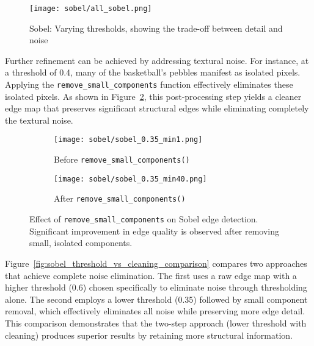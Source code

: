 \documentclass[12pt,a4paper]{article}
\begin{document}
\vspace{1cm}

\begin{figure}[H]
    \centering
    \texttt{[image: sobel/all\_sobel.png]}
    \caption{Sobel: Varying thresholds, showing the trade-off between detail and noise}
    \label{fig:sobel_visual_results}
\end{figure}


\newpage

Further refinement can be achieved by addressing textural noise. For instance, at a threshold of 0.4, many of the basketball's pebbles manifest as isolated pixels. Applying the \texttt{remove\_small\_components} function effectively eliminates these isolated pixels. As shown in Figure~\ref{fig:sobel_component_removal_comparison}, this post-processing step yields a cleaner edge map that preserves significant structural edges while eliminating completely the textural noise. 


\begin{figure}[H]
    \centering
    \begin{subfigure}{0.48\textwidth}
        \texttt{[image: sobel/sobel\_0.35\_min1.png]}
        \caption{Before \texttt{remove\_small\_components()}}
    \end{subfigure}
    \hfill
    \begin{subfigure}{0.48\textwidth}
        \texttt{[image: sobel/sobel\_0.35\_min40.png]}
        \caption{After \texttt{remove\_small\_components()}}
    \end{subfigure}
    \caption{Effect of \texttt{remove\_small\_components} on Sobel edge detection. Significant improvement in edge quality is observed after removing small, isolated components.}
    \label{fig:sobel_component_removal_comparison}
\end{figure}


Figure~\ref{fig:sobel_threshold_vs_cleaning_comparison} compares two approaches that achieve complete noise elimination. The first uses a raw edge map with a higher threshold (0.6) chosen specifically to eliminate noise through thresholding alone. The second employs a lower threshold (0.35) followed by small component removal, which effectively eliminates all noise while preserving more edge detail. This comparison demonstrates that the two-step approach (lower threshold with cleaning) produces superior results by retaining more structural information.
\end{document}
